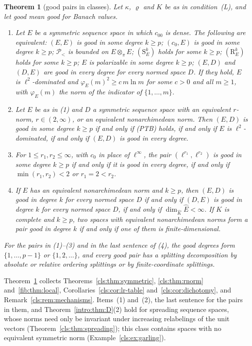 \documentclass[11pt]{amsart}
\theoremstyle{definition}
\theoremstyle{remark}
\numberwithin{equation}{section}
\newcommand{\Kh}{\widehat K}
\theoremstyle{plain}
\newtheorem{introtheorem}{Theorem}
\theoremstyle{definition}
\theoremstyle{plain}
\newcommand{\cP}{\mathcal P}
\begin{document}
\begin{introtheorem}[good pairs in classes]\label{intro:thm:E}
Let $\kappa$, $\varrho$ and $K$ be as in condition~\textup{(L)}, and let good mean good for Banach values.
\begin{enumerate}
\item Let $E$ be a symmetric sequence space in which $c_{00}$ is dense. The following are equivalent: $(E,E)$ is good
in some degree $k\ge p$; $(c_0,E)$ is good in some degree $k\ge p$; $\cP_<$ is bounded on $E\otimes_\pi E$;
$(\mathrm S^k_E)$ holds for some $k\ge p$; $(\mathrm R^k_E)$ holds for some $k\ge p$; $E$ is polarizable in some degree $k\ge p$; $(E,D)$ and $(D,E)$ are good in every
degree for every normed space $D$. If they hold, $E$ is $\ell^2$-dominated and $\varphi_E(m)^2\ge c\,m\ln m$ for some
$c>0$ and all $m\ge1$, with $\varphi_E(m)$ the norm of the indicator of $\{1,\dots,m\}$.
\item Let $E$ be as in \textup{(1)} and $D$ a symmetric sequence space with an equivalent $r$-norm, $r\in(2,\infty)$,
or an equivalent nonarchimedean norm. Then $(E,D)$ is good in some degree $k\ge p$ if and only if \textup{(PTB)}
holds, if and only if $E$ is $\ell^2$-dominated, if and only if $(E,D)$ is good in every degree.
\item For $1\le r_1,r_2\le\infty$, with $c_0$ in place of $\ell^\infty$, the pair $(\ell^{r_1},\ell^{r_2})$ is good in
some degree $k\ge p$ if and only if it is good in every degree, if and only if $\min(r_1,r_2)<2$ or $r_1=2<r_2$.
\item If $E$ has an equivalent nonarchimedean norm and $k\ge p$, then $(E,D)$ is good in degree $k$ for every normed
space $D$ if and only if $(D,E)$ is good in degree $k$ for every normed space $D$, if and only if $\dim_{\Kh}\widehat E<\infty$. If $K$ is complete and $k\ge p$, two
spaces with equivalent nonarchimedean norms form a pair good in degree $k$ if and only if one of them is
finite-dimensional.
\end{enumerate}
For the pairs in \textup{(1)}--\textup{(3)} and in the last sentence of \textup{(4)}, the good degrees form
$\{1,\dots,p-1\}$ or $\{1,2,\dots\}$, and every good pair has a splitting decomposition by absolute or relative
ordering splittings or by finite-coordinate splittings.
\end{introtheorem}

Theorem~\ref{intro:thm:E} collects Theorems~\ref{cls:thm:symmetric}, \ref{cls:thm:rnorm} and~\ref{fib:thm:local},
Corollaries~\ref{cls:cor:lr-table} and~\ref{cls:cor:dichotomy}, and Remark~\ref{cls:rem:mechanisms}. Items~(1)
and~(2), the last sentence for the pairs in them, and Theorem~\ref{intro:thm:D}(2) hold for spreading sequence spaces,
whose norms need only be invariant under increasing relabelings of the unit vectors (Theorem~\ref{cls:thm:spreading});
this class contains spaces with no equivalent symmetric norm (Example~\ref{cls:ex:garling}).
\end{document}
